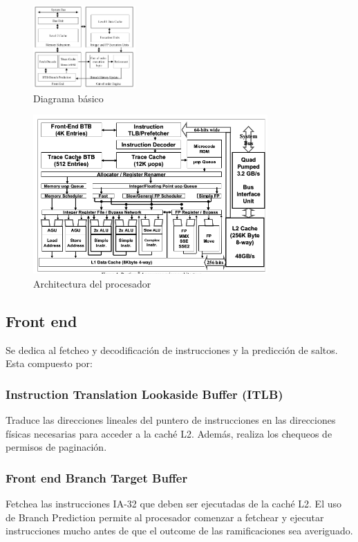 \begin{figure}[ht]
	\centering
	\includegraphics[width=0.35\textwidth]{imagenes/p4-block-architecture}
	\caption{Diagrama básico}
	\label{fig:p4DiagramaBasico}
\end{figure}
\begin{figure}[ht]
	\centering
	\includegraphics[width=0.8\textwidth]{imagenes/p4-architecture}
	\caption{Architectura del procesador}
	\label{fig:p4DiagramaCompleto}
\end{figure}

\subsection{Front end}
Se dedica al fetcheo y decodificación de instrucciones y la predicción de saltos. Esta compuesto por:
\subsubsection*{Instruction Translation Lookaside Buffer (ITLB)}
Traduce las direcciones lineales del puntero de instrucciones en las direcciones físicas necesarias para acceder a la caché L2. Además, realiza los chequeos de permisos de paginación.

\subsubsection*{Front end Branch Target Buffer}\label{sec::Intel::Netburst::frontEnd::btb}
Fetchea las instrucciones IA-32 que deben ser ejecutadas de la caché L2. El uso de Branch Prediction permite al procesador comenzar a fetchear y ejecutar instrucciones mucho antes de que el outcome de las ramificaciones sea averiguado.
	
